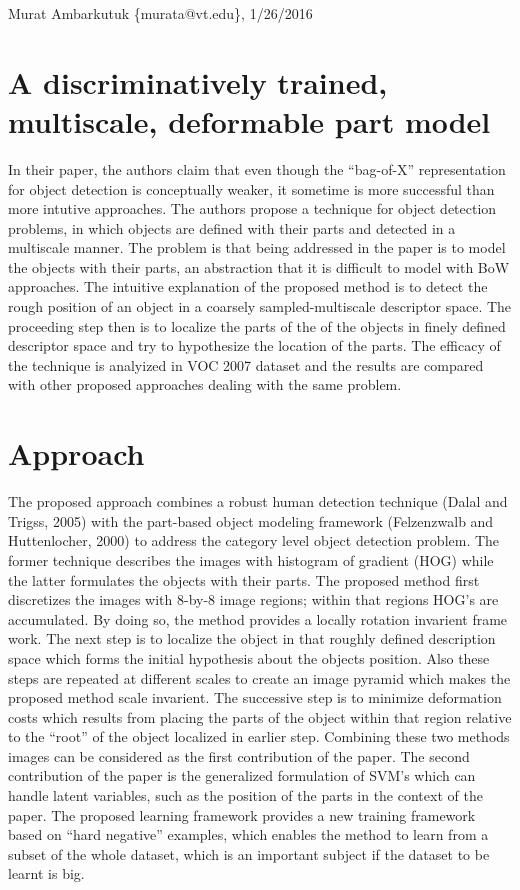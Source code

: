 \documentclass[11pt]{article}
\begin{document}
\thispagestyle{empty}
\begin{flushright}
	\small{Murat Ambarkutuk \{murata@vt.edu\}, 1/26/2016}
\end{flushright}
\section{A discriminatively trained, multiscale, deformable part model}
In their paper, the authors claim that even though the ``bag-of-X'' representation for object detection is conceptually weaker, it sometime is more successful than more intutive approaches.
The authors propose a technique for object detection problems, in which objects are defined with their parts and detected in a multiscale manner.
The problem is that being addressed in the paper is to model the objects with their parts, an abstraction that it is difficult to model with BoW approaches.
The intuitive explanation of the proposed method is to detect the rough position of an object in a coarsely sampled-multiscale descriptor space.
The proceeding step then is to localize the parts of the of the objects in finely defined descriptor space and try to hypothesize the location of the parts.
The efficacy of the technique is analyized in VOC 2007 dataset and the results are compared with other proposed approaches dealing with the same problem.
\section{Approach}
\indent The proposed approach combines a robust human detection technique (Dalal and Trigss, 2005) with the part-based object modeling framework (Felzenzwalb and Huttenlocher, 2000) to address the category level object detection problem.
The former technique describes the images with histogram of gradient (HOG) while the latter formulates the objects with their parts.
The proposed method first discretizes the images with 8-by-8 image regions; within that regions HOG's are accumulated.
By doing so, the method provides a locally rotation invarient frame work.
The next step is to localize the object in that roughly defined description space which forms the initial hypothesis about the objects position.
Also these steps are repeated at different scales to create an image pyramid which makes the proposed method scale invarient.
The successive step is to minimize deformation costs which results from placing the parts of the object within that region relative to the ``root'' of the object localized in earlier step.
Combining these two methods images can be considered as the first contribution of the paper. The second contribution of the paper is the generalized formulation of SVM's which can handle latent variables, such as the position of the parts in the context of the paper.
The proposed learning framework provides a new training framework based on ``hard negative'' examples, which enables the method to learn from a subset of the whole dataset, which is an important subject if the dataset to be learnt is big.
\end{document}

